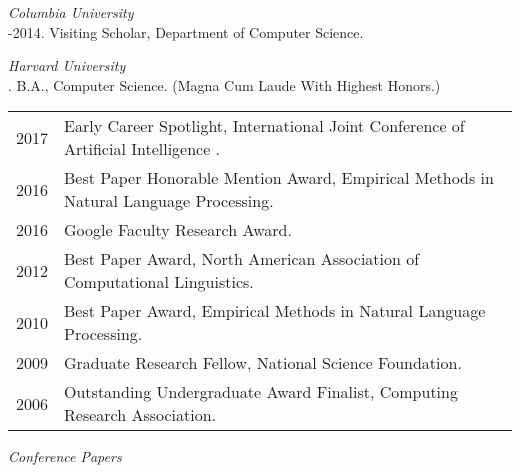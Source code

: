 \documentclass[11pt]{article}
\begin{document}
\medskip
\noindent\emph{Columbia University\vspace{0.02in}}\\
-2014. Visiting Scholar, Department of Computer Science.


\medskip
\noindent\emph{Harvard University\vspace{0.02in}}\\
. B.A., Computer Science. (Magna Cum Laude With Highest Honors.) 

\bigskip
 

\medskip

\hspace{-1cm} \begin{tabular}{lp{11.5cm}}
2017 & Early Career Spotlight, International Joint Conference of Artificial Intelligence . \\
2016 & Best Paper Honorable Mention Award, Empirical Methods in Natural Language Processing. \\
2016 & Google Faculty Research Award. \\
2012 & Best Paper Award, North American Association of Computational Linguistics. \\
2010 & Best Paper Award, Empirical Methods in Natural Language Processing. \\
2009 & Graduate Research Fellow, National Science Foundation.  \\
2006 & Outstanding Undergraduate Award Finalist, Computing Research Association. \\
  
\end{tabular}
\bigskip

\medskip
\noindent\emph{Conference Papers \vspace{0.01in}}
\end{document}
